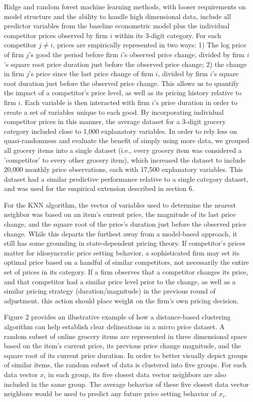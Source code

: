 \documentclass[11pt]{article}
\begin{document}
Ridge and random forest machine learning methods, with looser requirements on model structure and the ability to handle high dimensional data, include all predictor variables from the baseline econometric model plus the individual competitor prices observed by firm $i$ within its 3-digit category. For each competitor $j\neq i$, prices are empirically represented in two ways: 1) The log price of firm $j$'s good the period before firm $i$'s observed price change, divided by firm $i$'s square root price duration just before the observed price change; 2) the change in firm $j$'s price since the last price change of firm $i$, divided by firm $i$'s square root duration just before the observed price change. This allows us to quantify the impact of a competitor's price level, as well as its pricing history relative to firm $i$. Each variable is then interacted with firm $i$'s price duration in order to create a set of variables unique to each good. By incorporating individual competitor prices in this manner, the average dataset for a 3-digit grocery category included close to 1,000 explanatory variables. In order to rely less on quasi-randomness and evaluate the benefit of simply using more data, we grouped all grocery items into a single dataset (i.e., every grocery item was considered a 'competitor' to every other grocery item), which increased the dataset to include 20,000 monthly price observations, each with 17,500 explanatory variables. This dataset had a similar predictive performance relative to a single category dataset, and was used for the empirical extension described in section 6.  

For the KNN algorithm, the vector of variables used to determine the nearest neighbor was based on an item's current price, the magnitude of its last price change, and the square root of the price's duration just before the observed price change. While this departs the furthest away from a model-based approach, it still has some grounding in state-dependent pricing theory. If competitor's prices matter for idiosyncratic price setting behavior, a sophisticated firm may set its optimal price based on a handful of similar competitors, not necessarily the entire set of prices in its category. If a firm observes that a competitor changes its price, and that competitor had a similar price level prior to the change, as well as a similar pricing strategy (duration/magnitude) in the previous round of adjustment, this action should place weight on the firm's own pricing decision. 

Figure 2 provides an illustrative example of how a distance-based clustering algorithm can help establish clear delineations in a micro price dataset. A random subset of online grocery items are represented in three dimensional space based on the item's current price, its previous price change magnitude, and the square root of its current price duration. In order to better visually depict groups of similar items, the random subset of data is clustered into five groups. For each data vector $x_{i}$ in each group, its five closest data vector neighbors are also included in the same group. The average behavior of these five closest data vector neighbors would be used to predict any future price setting behavior of $x_{i}$.
\end{document}
